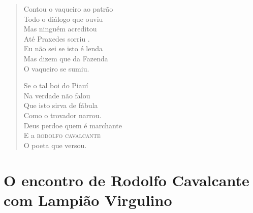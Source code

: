 \begin{verse}
Contou o vaqueiro ao patrão \\
Todo o diálogo que ouviu \\
Mas ninguém acreditou \\
Até Praxedes sorriu . \\
Eu não sei se isto é lenda \\
Mas dizem que da Fazenda \\
O vaqueiro se sumiu. 


Se o tal boi do Piauí\\
Na verdade não falou \\
Que isto sirva de fábula \\
Como o trovador narrou. \\
Deus perdoe quem é marchante \\
E a \textsc{rodolfo cavalcante} \\
O poeta que versou. 
\end{verse}

\chapter{O encontro de Rodolfo Cavalcante com Lampião Virgulino }

